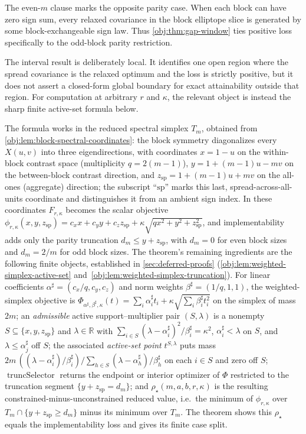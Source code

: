The even-\(m\) clause marks the opposite parity case. When each block can have zero sign sum, every relaxed covariance in the block elliptope slice is generated by some block-exchangeable sign law. Thus \cref{obj:thm:gap-window} ties positive loss specifically to the odd-block parity restriction.

The interval result is deliberately local. It identifies one open region where the spread covariance is the relaxed optimum and the loss is strictly positive, but it does not assert a closed-form global boundary for exact attainability outside that region. For computation at arbitrary \(r\) and \(\kappa\), the relevant object is instead the sharp finite active-set formula below.

The formula works in the reduced spectral simplex \(T_m\), obtained from \cref{obj:lem:block-spectral-coordinates}: the block symmetry diagonalizes every \(X(u,v)\) into three eigendirections, with coordinates \(x=1-u\) on the within-block contrast space (multiplicity \(q=2(m-1)\)), \(y=1+(m-1)u-mv\) on the between-block contrast direction, and \(z_{\mathrm{sp}}=1+(m-1)u+mv\) on the all-ones (aggregate) direction; the subscript ``\(\mathrm{sp}\)'' marks this last, spread-across-all-units coordinate and distinguishes it from an ambient sign index. In these coordinates \(F_{r,\kappa}\) becomes the scalar objective \(\phi_{r,\kappa}(x,y,z_{\mathrm{sp}})=c_xx+c_yy+c_zz_{\mathrm{sp}}+\kappa\sqrt{qx^2+y^2+z_{\mathrm{sp}}^2}\), and implementability adds only the parity truncation \(d_m\le y+z_{\mathrm{sp}}\), with \(d_m=0\) for even block sizes and \(d_m=2/m\) for odd block sizes. The theorem's remaining ingredients are the following finite objects, established in \cref{sec:deferred-proofs} (\cref{obj:lem:weighted-simplex-active-set} and~\cref{obj:lem:weighted-simplex-truncation}). For linear coefficients \(\alpha^\sharp=(c_x/q,c_y,c_z)\) and norm weights \(\beta^\sharp=(1/q,1,1)\), the weighted-simplex objective is \(\Phi_{\alpha^\sharp,\beta^\sharp,\kappa}(t)=\sum_i\alpha^\sharp_i t_i+\kappa\sqrt{\sum_i\beta^\sharp_i t_i^2}\) on the simplex of mass \(2m\); an \emph{admissible} active support–multiplier pair \((S,\lambda)\) is a nonempty \(S\subseteq\{x,y,z_{\mathrm{sp}}\}\) and \(\lambda\in\mathbb R\) with \(\sum_{i\in S}(\lambda-\alpha^\sharp_i)^2/\beta^\sharp_i=\kappa^2\), \(\alpha^\sharp_i<\lambda\) on \(S\), and \(\lambda\le\alpha^\sharp_j\) off \(S\); the associated \emph{active-set point} \(t^{S,\lambda}\) puts mass \(2m\,((\lambda-\alpha^\sharp_i)/\beta^\sharp_i)/\sum_{h\in S}(\lambda-\alpha^\sharp_h)/\beta^\sharp_h\) on each \(i\in S\) and zero off \(S\); \(\operatorname{truncSelector}\) returns the endpoint or interior optimizer of \(\Phi\) restricted to the truncation segment \(\{y+z_{\mathrm{sp}}=d_m\}\); and \(\rho_\star(m,a,b,r,\kappa)\) is the resulting constrained-minus-unconstrained reduced value, i.e.\ the minimum of \(\phi_{r,\kappa}\) over \(T_m\cap\{y+z_{\mathrm{sp}}\ge d_m\}\) minus its minimum over \(T_m\). The theorem shows this \(\rho_\star\) equals the implementability loss and gives its finite case split.

